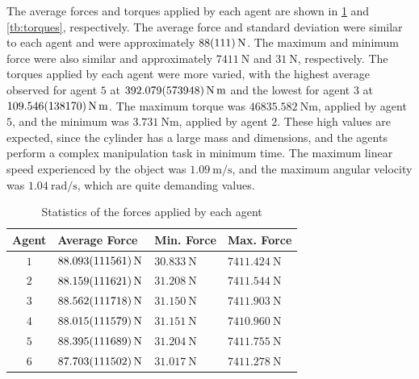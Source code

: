 The average forces and torques applied by each agent are shown in \cref{tb:forces} and \cref{tb:torques}, respectively. The average force and standard deviation were similar to each agent and were approximately $\qty{88 \pm 111}{\newton}$. The maximum and minimum force were also similar and approximately $\qty{7411}{\newton}$ and $\qty{31}{\newton}$, respectively. The torques applied by each agent were more varied, with the highest average observed for agent $5$ at $\qty{392.079 \pm 573.948}{\newton\meter}$ and the lowest for agent $3$ at $\qty{109.546 \pm 138.17}{\newton\meter}$. The maximum torque was $\qty{46835.582}{\newton\meter}$, applied by agent $5$, and the minimum was $\qty{3.731}{\newton\meter}$, applied by agent $2$. These high values are expected, since the cylinder has a large mass and dimensions, and the agents perform a complex manipulation task in minimum time. The maximum linear speed experienced by the object was $\qty{1.09}{\meter\per\second}$, and the maximum angular velocity was $\qty{1.04}{\radian\per\second}$, which are quite demanding values.
\begin{table}[ht]
    \centering
    \caption{Statistics of the forces applied by each agent}\label{tb:forces}
    \begin{tabular}{clll}
    Agent & Average Force & Min. Force & Max. Force\\\hline
    $1$ & $\qty{88.093 \pm 111.561}{\newton}$ & $\qty{30.833}{\newton}$ & $\qty{7411.424}{\newton}$ \\
    $2$ & $\qty{88.159 \pm 111.621}{\newton}$ & $\qty{31.208}{\newton}$ & $\qty{7411.544}{\newton}$ \\
    $3$ & $\qty{88.562 \pm 111.718}{\newton}$ & $\qty{31.150}{\newton}$ & $\qty{7411.903}{\newton}$ \\
    $4$ & $\qty{88.015 \pm 111.579}{\newton}$ & $\qty{31.151}{\newton}$ & $\qty{7410.960}{\newton}$ \\
    $5$ & $\qty{88.395 \pm 111.689}{\newton}$ & $\qty{31.204}{\newton}$ & $\qty{7411.755}{\newton}$ \\
    $6$ & $\qty{87.703 \pm 111.502}{\newton}$ & $\qty{31.017}{\newton}$ & $\qty{7411.278}{\newton}$
    \\\hline
    \end{tabular}
\end{table}
